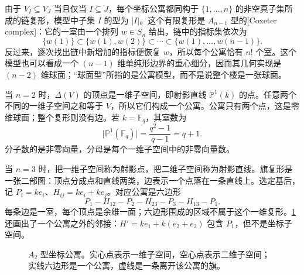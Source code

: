 \ProseParagraphBreak

由于 \(V_I\subseteq V_J\) 当且仅当 \(I\subseteq J\)，每个坐标公寓都同构于 \(\{1,\ldots,n\}\) 的非空真子集所成的链复形，模型中子集 \(I\) 的型为 \(\lvert I\rvert\)。这个有限复形是 \(A_{n-1}\) 型的[Coxeter complex]：它的一室由一个排列 \(w\in S_n\) 给出，链中的指标集依次为
\[
	\{w(1)\}\subset\{w(1),w(2)\}\subset\cdots
	\subset\{w(1),\ldots,w(n-1)\}.
\]
反过来，逐次找出链中新增加的指标便恢复 \(w\)，所以每个公寓恰有 \(n!\) 个室。这个模型也可以看成一个 \((n-1)\) 维单纯形边界的重心细分，因而其几何实现是 \((n-2)\) 维球面；“球面型”所指的是公寓模型，而不是说整个楼是一张球面。

\ProseParagraphBreak

当 \(n=2\) 时，\(\Delta(V)\) 的顶点是一维子空间，即射影直线 \(\mathbb P^1(k)\) 的点。任意两个不同的一维子空间之和等于 \(V\)，所以它们构成一个公寓。公寓只有两个点，这是零维球面；整个复形则没有边。若 \(k=\mathbb F_q\)，其室数为
\[
	\lvert\mathbb P^1(\mathbb F_q)\rvert
	=\frac{q^2-1}{q-1}=q+1.
\]
分子数的是非零向量，分母是每个一维子空间中的非零向量数。

\ProseParagraphBreak

当 \(n=3\) 时，把一维子空间称为射影点，把二维子空间称为射影直线。旗复形是一张二部图：顶点分成点和直线两类，边表示一个点落在一条直线上。选定基后，记 \(P_i=ke_i\)、\(H_{ij}=ke_i+ke_j\)。对应公寓是六边形
\[
	P_1-H_{12}-P_2-H_{23}-P_3-H_{13}-P_1.
\]
每条边是一室，每个顶点是余维一面；六边形围成的区域不属于这个一维复形。\cref{b5:fig:F-A2-apartment}还画出了一个公寓之外的邻接：\(H'=ke_1+k(e_2+e_3)\) 包含 \(P_1\)，但不是坐标子空间。

\begin{figure}[htbp]
	\centering
	\caption[\(A_2\) 型坐标公寓]{\(A_2\) 型坐标公寓。实心点表示一维子空间，空心点表示二维子空间；实线六边形是一个公寓，虚线是一条离开该公寓的旗。}
	\label{b5:fig:F-A2-apartment}
\end{figure}

